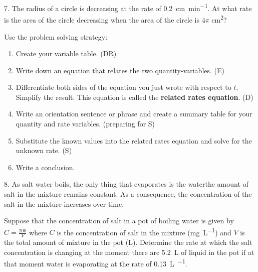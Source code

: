 \documentclass[10pt,oneside,]{book}
\newcommand{\terminology}[1]{\textbf{#1}}
\newcommand{\acronym}[1]{#1}
\theoremstyle{plain}
\theoremstyle{definition}
\numberwithin{equation}{section}
\begin{document}
\par\smallskip\noindent
\begin{exerciselist}
\item[7.]\hypertarget{exercise-549}{\null}The radius of a circle is decreasing at the rate of \SI{0.2}{\centi\meter\per\minute}. At what rate is the area of the circle decreasing when the area of the circle is \(4\pi\) \si{\centi\meter\tothe{2}}?%
\par
Use the problem solving strategy:%
\begin{enumerate}[label=(\alph*)]
\item{}Create your variable table. (\acronym{DR})\item{}Write down an equation that relates the two quantity-variables. (\acronym{E})\item{}Differentiate both sides of the equation you just wrote with respect to \(t\). Simplify the result. This equation is called the \terminology{related rates equation}. (\acronym{D})\item{}Write an orientation sentence or phrase and create a summary table for your quantity and rate variables. (preparing for \acronym{S})\item{}Substitute the known values into the related rates equation and solve for the unknown rate. (\acronym{S})\item{}Write a conclusion.\end{enumerate}
\par\smallskip
\item[8.]\hypertarget{exercise-550}{\null}As salt water boils, the only thing that evaporates is the water\textemdash{}the amount of salt in the mixture remains constant. As a consequence, the concentration of the salt in the mixture increases over time.%
\par
Suppose that the concentration of salt in a pot of boiling water is given by \(C=\frac{200}{V}\) where \(C\) is the concentration of salt in the mixture (\si{\milli\gram\per\liter}) and \(V\) is the total amount of mixture in the pot (\si{\liter}). Determine the rate at which the salt concentration is changing at the moment there are \SI{5.2}{\liter} of liquid in the pot if at that moment water is evaporating at the rate of \SI{0.13}{\liter\per\min}.%
\par\smallskip
\end{exerciselist}
\typeout{************************************************}
\typeout{************************************************}
\end{document}
